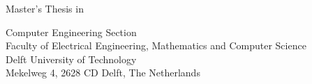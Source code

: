 \begin{titlepage}

  \begin{center}
  \null\vfill
    \begin{center}
    \LARGE{\reportTitle}
    \end{center}

    \vspace{3cm}

    \begin{large}
    Master's Thesis in \reportMSC
    \end{large}

    \vspace{1.5cm}

    \begin{normalsize}
    Computer Engineering Section\\
    Faculty of Electrical Engineering, Mathematics and Computer Science\\
    Delft University of Technology\\
    Mekelweg 4, 2628 CD Delft, The Netherlands
    \end{normalsize}

    \vspace{2.0cm}

    \begin{normalsize}
    \reportAuthor \\
    \reportUrlEmail
    \end{normalsize}

    \vspace{1.0cm}

    \reportDate             %

  \vfill
  \end{center}

\end{titlepage}
